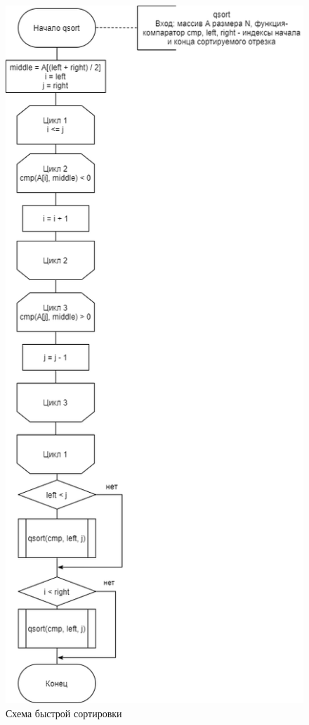 \documentclass[12pt]{report}
\begin{document}
\begin{figure}[H]
	\raggedleft
	\includegraphics[scale=0.6]{qsort.png}
	\caption{Схема быстрой сортировки}
	\label{qsorts}
\end{figure}
\end{document}
